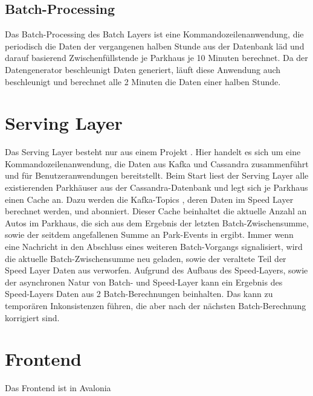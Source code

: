 \subsection{Batch-Processing}
Das Batch-Processing des Batch Layers ist eine Kommandozeilenanwendung, die periodisch die Daten der vergangenen halben Stunde aus der Datenbank läd und darauf basierend Zwischenfüllstende je Parkhaus je 10 Minuten berechnet.
Da der Datengenerator beschleunigt Daten generiert, läuft diese Anwendung auch beschleunigt und berechnet alle 2 Minuten die Daten einer halben Stunde.



\section{Serving Layer}
Das Serving Layer besteht nur aus einem Projekt .
Hier handelt es sich um eine Kommandozeilenanwendung, die Daten aus Kafka und Cassandra zusammenführt und für Benutzeranwendungen bereitstellt.
Beim Start liest der Serving Layer alle existierenden Parkhäuser aus der Cassandra-Datenbank und legt sich je Parkhaus einen Cache an.
Dazu werden die Kafka-Topics , deren Daten im Speed Layer berechnet werden, und  abonniert.
Dieser Cache beinhaltet die aktuelle Anzahl an Autos im Parkhaus, die sich aus dem Ergebnis der letzten Batch-Zwischensumme, sowie der seitdem angefallenen Summe an Park-Events in  ergibt.
Immer wenn eine Nachricht in  den Abschluss eines weiteren Batch-Vorgangs signalisiert, wird die aktuelle Batch-Zwischensumme neu geladen, sowie der veraltete Teil der Speed Layer Daten aus  verworfen.
Aufgrund des Aufbaus des Speed-Layers, sowie der asynchronen Natur von Batch- und Speed-Layer kann ein Ergebnis des Speed-Layers Daten aus 2 Batch-Berechnungen beinhalten.
Das kann zu temporären Inkonsistenzen führen, die aber nach der nächsten Batch-Berechnung korrigiert sind.

\section{Frontend}
Das Frontend ist in Avalonia 
